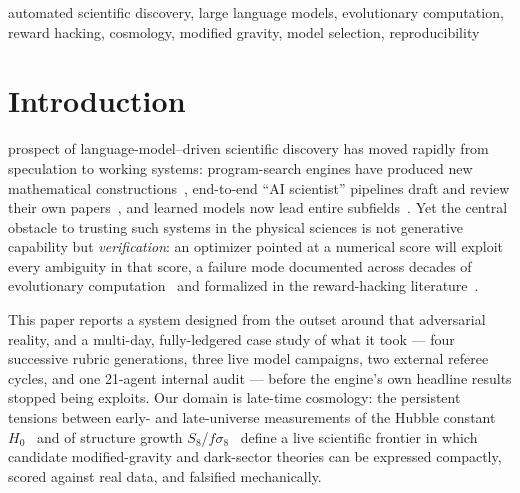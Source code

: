 \documentclass[journal]{IEEEtran}
\newcommand{\fsig}{f\sigma_8}
\begin{document}
\begin{IEEEkeywords}
automated scientific discovery, large language models, evolutionary computation, reward
hacking, cosmology, modified gravity, model selection, reproducibility
\end{IEEEkeywords}

\section{Introduction}
 prospect of language-model--driven scientific discovery has moved
rapidly from speculation to working systems: program-search engines have produced new
mathematical constructions~\cite{funsearch2024}, end-to-end ``AI scientist'' pipelines
draft and review their own papers~\cite{aiscientist2024}, and learned models now lead
entire subfields~\cite{alphafold2021}. Yet the central obstacle to trusting such systems
in the physical sciences is not generative capability but \emph{verification}: an
optimizer pointed at a numerical score will exploit every ambiguity in that score, a
failure mode documented across decades of evolutionary computation~\cite{lehman2020} and
formalized in the reward-hacking literature~\cite{amodei2016,skalse2022,pan2022}.

This paper reports a system designed from the outset around that adversarial reality,
and a multi-day, fully-ledgered case study of what it took --- four successive rubric
generations, three live model campaigns, two external referee cycles, and one 21-agent
internal audit --- before the engine's own headline results stopped being exploits. Our
domain is late-time cosmology: the persistent tensions between early- and late-universe
measurements of the Hubble constant $H_0$~\cite{planck2018,riess2022} and of structure
growth $S_8$/$\fsig$~\cite{kids1000,eboss2021} define a live scientific frontier in which
candidate modified-gravity and dark-sector theories
\cite{dgp2000,husawicki2007,simpson2010} can be expressed compactly, scored against real
data, and falsified mechanically.
\end{document}
